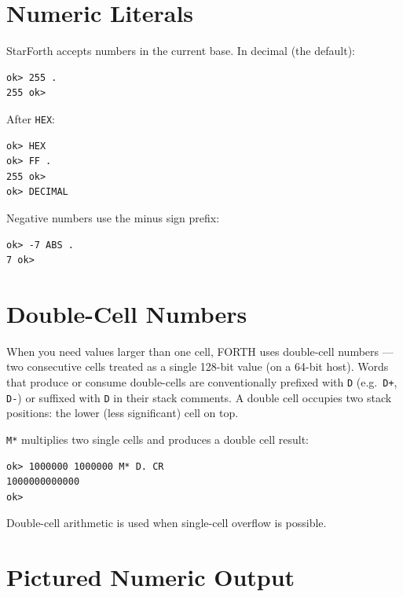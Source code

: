 \section{Numeric Literals}
\label{sec:numeric-literals}

StarForth accepts numbers in the current base. In decimal (the default):

\begin{lstlisting}[language=Forth]
ok> 255 .
255 ok>
\end{lstlisting}

After \texttt{HEX}:

\begin{lstlisting}[language=Forth]
ok> HEX
ok> FF .
255 ok>
ok> DECIMAL
\end{lstlisting}

Negative numbers use the minus sign prefix:

\begin{lstlisting}[language=Forth]
ok> -7 ABS .
7 ok>
\end{lstlisting}

\section{Double-Cell Numbers}
\label{sec:double-cell}

When you need values larger than one cell, FORTH uses double-cell numbers ---
two consecutive cells treated as a single 128-bit value (on a 64-bit host).
Words that produce or consume double-cells are conventionally prefixed with
\texttt{D} (e.g.\ \texttt{D+}, \texttt{D-}) or suffixed with \texttt{D} in
their stack comments. A double cell occupies two stack positions: the lower
(less significant) cell on top.

\texttt{M*} multiplies two single cells and produces a double cell result:

\begin{lstlisting}[language=Forth]
ok> 1000000 1000000 M* D. CR
1000000000000
ok>
\end{lstlisting}

Double-cell arithmetic is used when single-cell overflow is possible.

\section{Pictured Numeric Output}
\label{sec:pictured-output}

